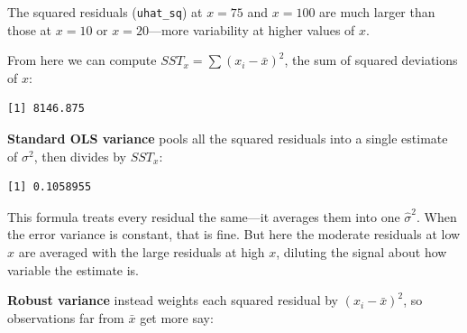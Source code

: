 \documentclass[
  letterpaper,
  DIV=11,
  numbers=noendperiod]{scrreprt}
\newenvironment{Shaded}{\begin{snugshade}}{\end{snugshade}}
\newcommand{\CommentTok}[1]{\textcolor[rgb]{0.37,0.37,0.37}{#1}}
\newcommand{\DecValTok}[1]{\textcolor[rgb]{0.68,0.00,0.00}{#1}}
\newcommand{\FunctionTok}[1]{\textcolor[rgb]{0.28,0.35,0.67}{#1}}
\newcommand{\NormalTok}[1]{\textcolor[rgb]{0.00,0.23,0.31}{#1}}
\newcommand{\OtherTok}[1]{\textcolor[rgb]{0.00,0.23,0.31}{#1}}
\newcommand{\SpecialCharTok}[1]{\textcolor[rgb]{0.37,0.37,0.37}{#1}}
\begin{document}
The squared residuals (\texttt{uhat\_sq}) at \(x = 75\) and \(x = 100\)
are much larger than those at \(x = 10\) or \(x = 20\)---more
variability at higher values of \(x\).

From here we can compute \(SST_x = \sum (x_i - \bar{x})^2\), the sum of
squared deviations of \(x\):

\begin{Shaded}
\end{Shaded}

\begin{verbatim}
[1] 8146.875
\end{verbatim}

\textbf{Standard OLS variance} pools all the squared residuals into a
single estimate of \(\sigma^2\), then divides by \(SST_x\):

\begin{Shaded}
\end{Shaded}

\begin{verbatim}
[1] 0.1058955
\end{verbatim}

This formula treats every residual the same---it averages them into one
\(\hat{\sigma}^2\). When the error variance is constant, that is fine.
But here the moderate residuals at low \(x\) are averaged with the large
residuals at high \(x\), diluting the signal about how variable the
estimate is.

\textbf{Robust variance} instead weights each squared residual by
\((x_i - \bar{x})^2\), so observations far from \(\bar{x}\) get more
say:
\end{document}
